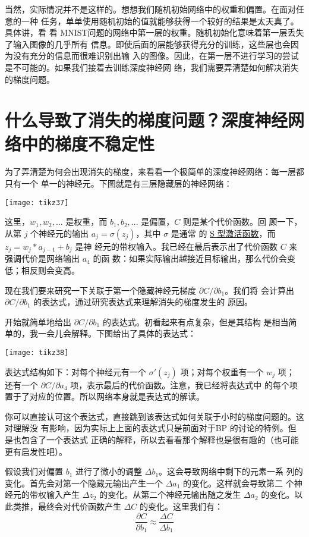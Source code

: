 当然，实际情况并不是这样的。想想我们随机初始网络中的权重和偏置。在面对任意的一种
任务，单单使用随机初始的值就能够获得一个较好的结果是太天真了。具体讲，看
看 MNIST问题的网络中第一层的权重。随机初始化意味着第一层丢失了输入图像的几乎所有
信息。即使后面的层能够获得充分的训练，这些层也会因为没有充分的信息而很难识别出输
入的图像。因此，在第一层不进行学习的尝试是不可能的。如果我们接着去训练深度神经网
络，我们需要弄清楚如何解决消失的梯度问题。

\section{什么导致了消失的梯度问题？深度神经网络中的梯度不稳定性}

为了弄清楚为何会出现消失的梯度，来看看一个极简单的深度神经网络：每一层都只有一个
单一的神经元。下图就是有三层隐藏层的神经网络：
\begin{center}
  \texttt{[image: tikz37]}
\end{center}

这里，$w_1, w_2, ...$ 是权重，而 $b_1, b_2, ...$ 是偏置，$C$ 则是某个代价函数。回
顾一下，从第 $j$ 个神经元的输出 $a_j = \sigma(z_j)$，其中 $\sigma$ 是通常
的 \hyperref[sigmoid_neurons]{S 型激活函数}，而 $z_j = w_j * a_{j-1} + b_j$ 是神
经元的带权输入。我已经在最后表示出了代价函数 $C$ 来强调代价是网络输出 $a_4$ 的函
数：如果实际输出越接近目标输出，那么代价会变低；相反则会变高。
 
现在我们要来研究一下关联于第一个隐藏神经元梯度 $\partial C/\partial b_1$。我们将
会计算出 $\partial C/\partial b_1$ 的表达式，通过研究表达式来理解消失的梯度发生的
原因。
 
开始就简单地给出 $\partial C/\partial b_1$ 的表达式。初看起来有点复杂，但是其结构
是相当简单的，我一会儿会解释。下图给出了具体的表达式：
\begin{center}
  \texttt{[image: tikz38]}
\end{center}

表达式结构如下：对每个神经元有一个 $\sigma'(z_j)$ 项；对每个权重有一个 $w_j$ 项；
还有一个 $\partial C/\partial a_4$ 项，表示最后的代价函数。注意，我已经将表达式中
的每个项置于了对应的位置。所以网络本身就是表达式的解读。
 
你可以直接认可这个表达式，直接跳到该表达式如何关联于小时的梯度问题的。这对理解没
有影响，因为实际上上面的表达式只是前面对于BP 的讨论的特例。但是也包含了一个表达式
正确的解释，所以去看看那个解释也是很有趣的（也可能更有启发性吧）。
 
假设我们对偏置 $b_1$ 进行了微小的调整 $\Delta b_1$。这会导致网络中剩下的元素一系
列的变化。首先会对第一个隐藏元输出产生一个 $\Delta a_1$ 的变化。这样就会导致第二
个神经元的带权输入产生 $\Delta z_2$ 的变化。从第二个神经元输出随之发生 $\Delta
a_2$ 的变化。以此类推，最终会对代价函数产生 $\Delta C$ 的变化。这里我们有：
\begin{equation}
  \frac{\partial C}{\partial b_1} \approx \frac{\Delta C}{\Delta b_1}
  \label{eq:114}\tag{114}
\end{equation}

